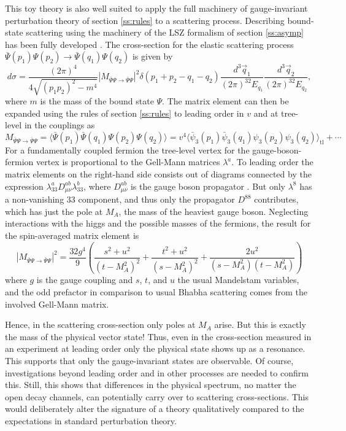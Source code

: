 \documentclass[final,twoside,12pt]{article}
\newcommand*{\no}{\noindent}
\newcommand*{\be}{\begin{equation}}
\newcommand*{\ee}{\end{equation}}
\newcommand*{\nn}{\nonumber}
\newcommand*{\1}{1\!\!\!\bot}
\begin{document}
This toy theory is also well suited to apply the full machinery of gauge-invariant perturbation theory of section \ref{ss:rules} to a scattering process. Describing bound-state scattering using the machinery of the LSZ formalism of section \ref{ss:asymp} has been fully developed \cite{Bohm:2001yx}. The cross-section for the elastic scattering process $\bar{\Psi}(p_1)\Psi(p_2)\to\bar{\Psi}(q_1)\Psi(q_2)$ is given by
\be
d\sigma=\frac{(2\pi)^4}{4\sqrt{(p_1p_2)^2-m^4}}|M_{\bar{\Psi}\Psi\to\bar{\Psi}\Psi}|^2\delta(p_1+p_2-q_1-q_2)\frac{d^3\vec q_1}{(2\pi)^32E_{q_1}}\frac{d^3\vec q_2}{(2\pi)^32E_{q_2}}\nn,
\ee
\no where $m$ is the mass of the bound state $\Psi$. The matrix element can then be expanded using the rules of section \ref{ss:rules} to leading order in $v$ and at tree-level in the couplings as
\be
M_{\bar{\Psi}\Psi\to\bar{\Psi}\Psi}=\big\langle\bar{\Psi}(p_1)\bar{\Psi}(q_1)\Psi(p_2)\Psi(q_2)\big\rangle =v^4\big\langle\bar{\psi}_3(p_1)\bar{\psi}_3(q_1)\psi_3(p_2)\psi_3(q_2)\big\rangle_\mathrm{tl}+\cdots\;\nn
\ee
\no For a fundamentally coupled fermion the tree-level vertex for the gauge-boson-fermion vertex is proportional to the Gell-Mann matrices $\lambda^a$. To leading order the matrix elements on the right-hand side consists out of diagrams connected by the expression $\lambda_{33}^aD_{\mu\nu}^{ab}\lambda_{33}^b$, where $D_{\mu\nu}^{ab}$ is the gauge boson propagator \cite{Bohm:2001yx}. But only $\lambda^8$ has a non-vanishing $33$ component, and thus only the propagator $D^{88}$ contributes, which has just the pole at $M_A$, the mass of the heaviest gauge boson. Neglecting interactions with the higgs and the possible masses of the fermions, the result for the spin-averaged matrix element is
\be
|M_{\bar{\Psi}\Psi\to\bar{\Psi}\Psi}|^2=\frac{32g^4}{9}\left(\frac{s^2+u^2}{(t-M_A^2)^2}+\frac{t^2+u^2}{(s-M_A^2)^2}+\frac{2u^2}{(s-M_A^2)(t-M_A^2)}\right)\nn
\ee
\no where $g$ is the gauge coupling and $s$, $t$, and $u$ the usual Mandelstam variables, and the odd prefactor in comparison to usual Bhabha scattering comes from the involved Gell-Mann matrix.

Hence, in the scattering cross-section only poles at $M_A$ arise. But this is exactly the mass of the physical vector state! Thus, even in the cross-section measured in an experiment at leading order only the physical state shows up as a resonance. This supports that only the gauge-invariant states are observable. Of course, investigations beyond leading order and in other processes are needed to confirm this. Still, this shows that differences in the physical spectrum, no matter the open decay channels, can potentially carry over to scattering cross-sections. This would deliberately alter the signature of a theory qualitatively compared to the expectations in standard perturbation theory.
\end{document}
